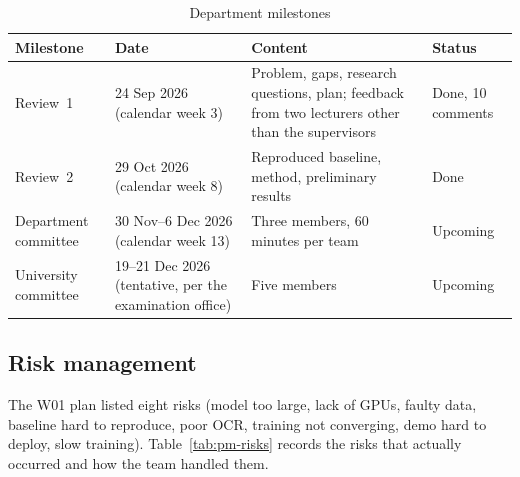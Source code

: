 \begin{table}[htbp]
\caption{Department milestones}
\label{tab:pm-milestones}
\centering
\small
\begin{tabular}{p{}p{}p{}p{}}
\toprule
\textbf{Milestone} & \textbf{Date} & \textbf{Content} & \textbf{Status} \\
\midrule
Review~1 & 24 Sep 2026 (calendar week 3) & Problem, gaps, research questions, plan; feedback from two lecturers other than the supervisors & Done, 10 comments \\
Review~2 & 29 Oct 2026 (calendar week 8) & Reproduced baseline, method, preliminary results & Done \\
Department committee & 30 Nov--6 Dec 2026 (calendar week 13) & Three members, 60 minutes per team & Upcoming \\
University committee & 19--21 Dec 2026 (tentative, per the examination office) & Five members & Upcoming \\
\bottomrule
\end{tabular}
\end{table}

\subsection{Risk management}
\label{sec:pm-risk}

The W01 plan listed eight risks (model too large, lack of GPUs, faulty data, baseline hard to
reproduce, poor OCR, training not converging, demo hard to deploy, slow training).
Table~\ref{tab:pm-risks} records the risks that actually occurred and how the team handled
them.

